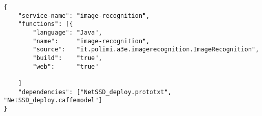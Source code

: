 

\begin{minipage}{\linewidth}
\begin{lstlisting}[caption=Image recognition service descriptor, label=lst:service-descriptor, captionpos=t]
{
	"service-name":	"image-recognition",
	"functions": [{	
		"language":	"Java",
		"name":		"image-recognition",
		"source":	"it.polimi.a3e.imagerecognition.ImageRecognition",
		"build":	"true",
		"web":		"true"
		
	]
	"dependencies": ["NetSSD_deploy.prototxt", "NetSSD_deploy.caffemodel"]
}
\end{lstlisting}
\end{minipage}


